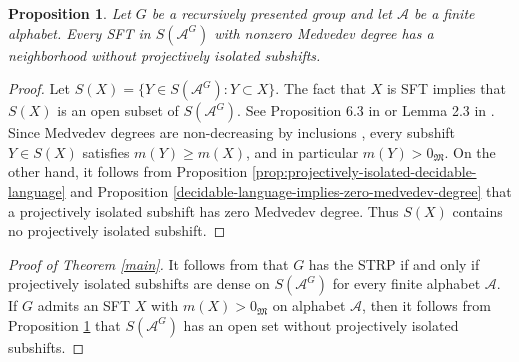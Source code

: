 \documentclass[a4paper,oneside]{amsart}
\renewcommand{\(}{\begin{dmath*}}
\renewcommand{\)}{\end{dmath*}}
\newtheorem{proposition}[theorem]{Proposition}
\theoremstyle{definition}
\newcommand{\A}{\mathcal{A}}
\begin{document}
\begin{proposition}\label{SFT-with-nonzero-degree-has-neighborhood-without-projectively-isolated-subshifts}
    Let $G$ be a recursively presented group and let $\A$ be a finite alphabet. Every SFT in $S(\A^G)$ with nonzero Medvedev degree has a neighborhood without projectively isolated subshifts. 
\end{proposition}
\begin{proof}
Let $S(X)=\{Y\in S(\A^G) : Y\subset X\}$. The fact that $X$ is SFT implies that $S(X)$ is an open subset of $S(\A^G)$. See Proposition 6.3 in \cite{carrasco-vargas_subshifts_2024} or Lemma 2.3 in \cite{pavlov_structure_2023}. Since Medvedev degrees are non-decreasing by inclusions \cite[Proposition 3.1] {barbieri_medvedev_2024}, every subshift $Y\in S(X)$ satisfies $m(Y)\geq m(X)$, and in particular $m(Y)>0_{\mathfrak M}$. On the other hand, it follows from 
Proposition \ref{prop:projectively-isolated-decidable-language} and Proposition \ref{decidable-language-implies-zero-medvedev-degree} that a projectively isolated subshift has zero Medvedev degree. Thus $S(X)$ contains no projectively isolated subshift. 
\end{proof}
\begin{proof}[Proof of Theorem \ref{main}] It follows from 
\cite[Theorem A]{doucha_strong_2024} that $G$ has the STRP if and only if projectively isolated subshifts are dense on $S(\A^G)$ for every finite alphabet $\A$. If $G$ admits an SFT $X$ with $m(X)>0_{\mathfrak M}$ on alphabet $\A$, then it follows from Proposition \ref{SFT-with-nonzero-degree-has-neighborhood-without-projectively-isolated-subshifts} that $S(\A^G)$ has an open set without projectively isolated subshifts. 
\end{proof}
\end{document}
